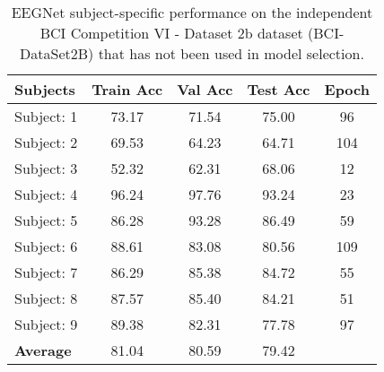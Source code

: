 \documentclass{ieeeaccess}
\newcommand{\ra}[1]{\renewcommand{\arraystretch}{#1}}
\begin{document}
{    
    \begin{table}[htb]  
        \centering\ra{1.1}
        \caption{EEGNet subject-specific performance on the independent BCI Competition VI - Dataset 2b dataset (BCI-DataSet2B) that has not been used in model selection.} 
        \label{EEGNetsubspe}
        \setlength{\tabcolsep}{10pt}
        \begin{tabular}{l|ccc|c}
            \toprule
            \textbf{Subjects} &  \textbf{Train Acc} &    \textbf{Val Acc} &   \textbf{Test Acc} &      \textbf{Epoch} \\
            \midrule
            Subject: 1 &      73.17 &      71.54 &      75.00 &      96 \\
            Subject: 2 &      69.53 &      64.23 &      64.71 &     104 \\
            Subject: 3 &      52.32 &      62.31 &      68.06 &      12 \\
            Subject: 4 &      96.24 &      97.76 &      93.24 &      23 \\
            Subject: 5 &      86.28 &      93.28 &      86.49 &      59 \\
            Subject: 6 &      88.61 &      83.08 &      80.56 &     109 \\
            Subject: 7 &      86.29 &      85.38 &      84.72 &      55 \\
            Subject: 8 &      87.57 &      85.40 &      84.21 &      51 \\
            Subject: 9 &      89.38 &      82.31 &      77.78 &      97 \\
            \midrule
            \textbf{Average}    &      81.04 &      80.59 &      79.42 &      \\
            \bottomrule
        \end{tabular}
        \label{EEGT}
    \end{table}
    
}
\end{document}
